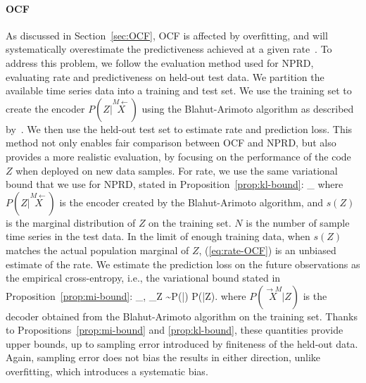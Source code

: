 \documentclass[entropy,article,submit,moreauthors,pdftex,10pt,a4paper]{Definitions/mdpi}
\newcommand{\E}[0]{\mathbb{E}}
\newcommand{\finitefuture}{\stackrel{\rightarrow \scriptscriptstyle{M}}{X}}
\newcommand{\finitepast}{\stackrel{\scriptscriptstyle{M}\leftarrow}{X}}%
\let\oldequation\equation
\let\oldendequation\endequation
\renewenvironment{equation}
  {\linenomathNonumbers\oldequation}
  {\oldendequation\endlinenomath}
\begin{document}
\paragraph{OCF} As discussed in Section~\ref{sec:OCF}, OCF is affected by overfitting, 
and will systematically overestimate the predictiveness achieved at a given rate~\citep{still-optimal-2010}.
To address this problem, we follow the evaluation method used for NPRD, evaluating rate and predictiveness on held-out test data.
We partition the available time series data into a training and test set. We use the training set to create the encoder $P(Z|\finitepast)$ using the Blahut-Arimoto algorithm as described by~\citet{still-optimal-2010}.
We then use the held-out test set to estimate rate and prediction loss.
This method not only enables fair comparison between OCF and NPRD, but also provides a more realistic evaluation, by focusing on the performance of the code $Z$ when deployed on new data samples.
For rate, we use the same variational bound that we use for NPRD, stated in Proposition~\ref{prop:kl-bound}:
\begin{equation}\label{eq:rate-OCF}
 \sum_{\finitepast \in {}} \infdivx{P(Z|\finitepast)}{s(Z)}
\end{equation}
where $P(Z|\finitepast)$ is the encoder created by the Blahut-Arimoto algorithm, and $s(Z)$ is the marginal distribution of $Z$ on the training set.
$N$ is the number of sample time series in the test data.
In the limit of enough training data, when $s(Z)$ matches the actual population marginal of $Z$, (\ref{eq:rate-OCF}) is an unbiased estimate of the rate. %
We estimate the prediction loss on the future observations as the empirical cross-entropy, i.e., the variational bound stated in Proposition~\ref{prop:mi-bound}:
\begin{equation}
 \sum_{\finitepast, \finitefuture \in {}} \E_{Z \sim P(\cdot|\finitepast)} \log P(\finitefuture|Z).
\end{equation}
where $P(\finitefuture|Z)$ is the decoder obtained from the Blahut-Arimoto algorithm on the training set.
Thanks to Propositions~\ref{prop:mi-bound} and \ref{prop:kl-bound}, these quantities provide upper bounds, up to sampling error introduced by finiteness of the held-out data.
Again, sampling error does not bias the results in either direction, unlike overfitting, which introduces a systematic bias.
\end{document}
